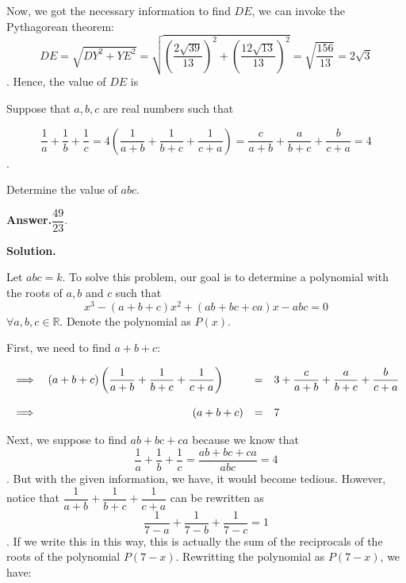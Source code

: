 \documentclass[12pt,paper=letter]{scrartcl}
\newcommand{\ans}[1]{{\sffamily \bfseries Answer.}\;\(\boxed{\text{#1}}\).}
\newcommand{\sol}{{\sffamily \bfseries Solution.}\;}
\begin{document}
\vspace{2mm}


Now, we got the necessary information to find $DE$, we can invoke the Pythagorean theorem: $$DE = \sqrt{DY^2 + YE^2} = \sqrt{\left(\dfrac{2\sqrt{39}}{13}\right)^2 + \left(\dfrac{12\sqrt{13}}{13}\right)^2} = \sqrt{\dfrac{156}{13}} = 2\sqrt{3}$$. Hence, the value of $DE$ is 

\begin{probboxed}
Suppose that $a, b, c$ are real numbers such that

$$\dfrac{1}{a} + \dfrac{1}{b} + \dfrac{1}{c} = 4\left( \dfrac{1}{a+b} + \dfrac{1}{b+c} + \dfrac{1}{c+a} \right) = \dfrac{c}{a+b} + \dfrac{a}{b+c} + \dfrac{b}{c+a} = 4$$.

Determine the value of $abc.$


\end{probboxed}

\ans{$\dfrac{49}{23}$}

\sol

Let $abc = k$. To solve this problem, our goal is to determine a polynomial with the roots of $a,b$ and $c$ such that $$x^3 - (a+b+c)x^2 + (ab+bc+ca)x -abc = 0$$ $\forall a,b,c \in \mathbb{R}$. Denote the polynomial as $P(x)$.

\vspace{2mm}

First, we need to find $a+b+c$:

\begin{center}
    \begin{equation*}
        \begin{array}{llll}
             \implies & (a+b+c)\left( \dfrac{1}{a+b} + \dfrac{1}{b+c} + \dfrac{1}{c+a} \right) & = & 3 + \dfrac{c}{a+b} + \dfrac{a}{b+c} + \dfrac{b}{c+a} \\
             
             \\
             
             \implies & \hspace{46mm} (a+b+c) & = & 7 \\                         
        \end{array}
    \end{equation*}
\end{center}

Next, we suppose to find $ab+bc+ca$ because we know that $$
\dfrac{1}{a} + \dfrac{1}{b} + \dfrac{1}{c} = \dfrac{ab+bc+ca}{abc}=4$$. But with the given information, we have, it would become tedious. However, notice that $\dfrac{1}{a+b} + \dfrac{1}{b+c} + \dfrac{1}{c+a}$ can be rewritten as $$\dfrac{1}{7-a} + \dfrac{1}{7-b} + \dfrac{1}{7-c} = 1$$. If we write this in this way, this is actually the sum of the reciprocals of the roots of the polynomial $P(7-x)$. Rewritting the polynomial as $P(7-x)$, we have:
\end{document}
